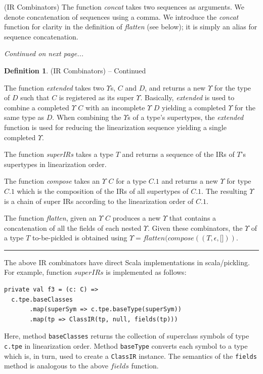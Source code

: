 \documentclass[preprint,10pt]{sigplanconf}
\theoremstyle{definition}
\theoremstyle{definition}
\newtheorem*{defn*}{Definition}
\begin{document}
\begin{defn}{(IR Combinators)}
The function \textit{concat} takes two sequences as arguments. We
denote concatenation of sequences using a comma. We introduce the
\textit{concat} function for clarity in the definition of \textit{flatten}
(see below); it is simply an alias for sequence concatenation.

\vspace{0.4cm}

\textit{Continued on next page...}

\vspace{0.6cm}

\end{defn}


\begin{defn*}{(IR Combinators) -- Continued}

The function \textit{extended} takes two $\Upsilon$s, $C$ and $D$, and returns a new
$\Upsilon$ for the type of $D$ such that $C$ is registered as its super $\Upsilon$.
Basically, \textit{extended} is used to combine a completed $\Upsilon$ $C$ with an
incomplete $\Upsilon$ $D$ yielding a completed $\Upsilon$ for the same type as $D$. When
combining the $\Upsilon$s of a type's supertypes, the \textit{extended} function is
used for reducing the linearization sequence yielding a single completed $\Upsilon$.

The function \textit{superIRs} takes a type $T$ and returns a sequence of the
IRs of $T$'s supertypes in linearization order.

The function \textit{compose} takes an $\Upsilon$ $C$ for a type $C.1$ and returns a
new $\Upsilon$ for type $C.1$ which is the composition of the IRs of all supertypes
of $C.1$. The resulting $\Upsilon$ is a chain of super IRs according to the
linearization order of $C.1$.

The function \textit{flatten}, given an $\Upsilon$ $C$ produces a new $\Upsilon$ that
contains a concatenation of all the fields of each nested $\Upsilon$. Given
these combinators, the $\Upsilon$ of a type $T$ to-be-pickled is obtained
using $\Upsilon = flatten(compose((T, \epsilon, \lbrack \rbrack))$.
\end{defn*}

\rule{0.9\columnwidth}{0.7pt}

The above IR combinators have direct Scala implementations in scala/pickling.
For example, function $superIRs$ is implemented as follows:

\begin{lstlisting}
private val f3 = (c: C) =>
  c.tpe.baseClasses
       .map(superSym => c.tpe.baseType(superSym))
       .map(tp => ClassIR(tp, null, fields(tp)))
\end{lstlisting}
\noindent
Here, method \verb|baseClasses| returns the collection of superclass symbols
of type \verb|c.tpe| in linearization order. Method \verb|baseType| converts
each symbol to a type which is, in turn, used to create a \verb|ClassIR|
instance. The semantics of the \verb|fields| method is analogous to the above
$fields$ function.
\end{document}
